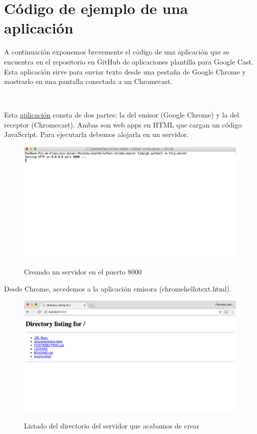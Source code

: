 \section{Código de ejemplo de una aplicación}

A continuación exponemos brevemente el código de una aplicación que se encuentra en el repositorio en GitHub de aplicaciones plantilla para Google Cast. Esta aplicación sirve para enviar texto desde una pestaña de Google Chrome y mostrarlo en una pantalla conectada a un Chromecast.

\

Esta \href{https://github.com/googlecast/CastHelloText-chrome}{aplicación} consta de dos partes: la del emisor (Google Chrome) y la del receptor (Chromecast).
Ambas son web apps en HTML que cargan un código JavaScript.
Para ejecutarla debemos alojarla en un servidor.

\begin{figure}[H]
	\centering
	\includegraphics[width=1.1\textwidth]{./Imagenes/creando_servidor.png}
	\label{fig:fondo}
	\caption{Creando un servidor en el puerto 8000}
\end{figure}

Desde Chrome, accedemos a la aplicación emisora (chromehellotext.html).

\begin{figure}[H]
	\centering
	\includegraphics[width=1.1\textwidth]{./Imagenes/directorylisting.png}
	\label{fig:fondo}
	\caption{Listado del directorio del servidor que acabamos de crear}
\end{figure}

